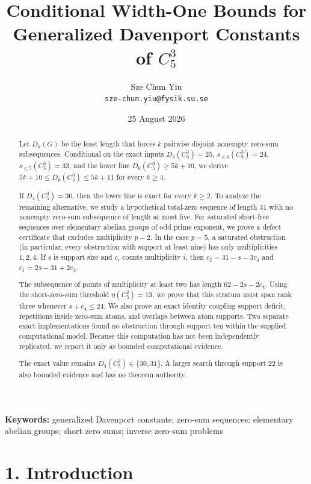\documentclass[
  11pt,
]{article}
\title{Conditional Width-One Bounds for Generalized Davenport Constants of \(C_5^3\)}
\author{Sze Chun Yiu\\\texttt{sze-chun.yiu@fysik.su.se}}
\date{25 August 2026}
\begin{document}
\maketitle

\begin{abstract}
Let \(D_k(G)\) be the least length that forces \(k\) pairwise disjoint
nonempty zero-sum subsequences. Conditional on the exact inputs
\(D_3(C_5^3)=25\), \(s_{\le6}(C_5^3)=24\), \(s_{\le5}(C_5^3)=33\), and
the lower line \(D_k(C_5^3)\ge5k+10\), we derive
\(5k+10\le D_k(C_5^3)\le5k+11\) for every \(k\ge4\).

If \(D_4(C_5^3)=30\), then the lower line is exact for every \(k\ge2\).
To analyze the remaining alternative, we study a hypothetical total-zero
sequence of length \(31\) with no nonempty zero-sum subsequence of
length at most five. For saturated short-free sequences over elementary
abelian groups of odd prime exponent, we prove a defect certificate that
excludes multiplicity \(p-2\). In the case \(p=5\), a saturated
obstruction (in particular, every obstruction with support at least
nine) has only multiplicities \(1,2,4\). If \(s\) is support size and
\(c_i\) counts multiplicity \(i\), then \(c_2=31-s-3c_4\) and
\(c_1=2s-31+2c_4\).

The subsequence of points of multiplicity at least two has length
\(62-2s-2c_4\). Using the short-zero-sum threshold \(\eta(C_5^2)=13\),
we prove that this stratum must span rank three whenever \(s+c_4\le24\).
We also prove an exact identity coupling support deficit, repetitions
inside zero-sum atoms, and overlaps between atom supports. Two separate
exact implementations found no obstruction through support ten within
the supplied computational model. Because this computation has not been
independently replicated, we report it only as bounded computational
evidence.

The exact value remains \(D_4(C_5^3)\in\{30,31\}\). A larger search
through support 22 is also bounded evidence and has no theorem
authority.

\end{abstract}

\noindent\textbf{Keywords:} generalized Davenport constants; zero-sum sequences;
elementary abelian groups; short zero sums; inverse zero-sum problems

\hypertarget{introduction}{%
\section{1. Introduction}\label{introduction}}
\end{document}
